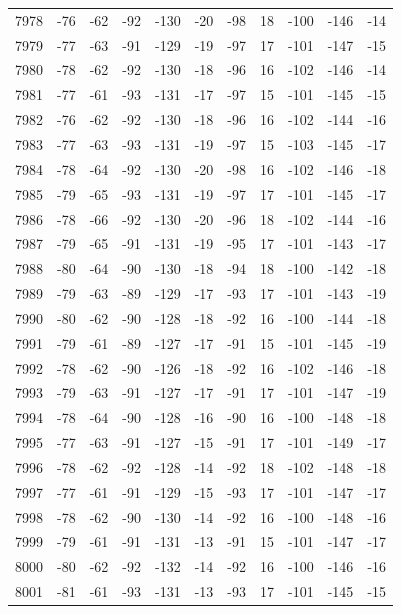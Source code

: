 \begin{table}[H]
\begin{tabular}{lllllllllll}
7978 & -76 & -62 & -92 & -130 & -20 & -98 & 18 & -100 & -146 & -14 \\
7979 & -77 & -63 & -91 & -129 & -19 & -97 & 17 & -101 & -147 & -15 \\
7980 & -78 & -62 & -92 & -130 & -18 & -96 & 16 & -102 & -146 & -14 \\
7981 & -77 & -61 & -93 & -131 & -17 & -97 & 15 & -101 & -145 & -15 \\
7982 & -76 & -62 & -92 & -130 & -18 & -96 & 16 & -102 & -144 & -16 \\
7983 & -77 & -63 & -93 & -131 & -19 & -97 & 15 & -103 & -145 & -17 \\
7984 & -78 & -64 & -92 & -130 & -20 & -98 & 16 & -102 & -146 & -18 \\
7985 & -79 & -65 & -93 & -131 & -19 & -97 & 17 & -101 & -145 & -17 \\
7986 & -78 & -66 & -92 & -130 & -20 & -96 & 18 & -102 & -144 & -16 \\
7987 & -79 & -65 & -91 & -131 & -19 & -95 & 17 & -101 & -143 & -17 \\
7988 & -80 & -64 & -90 & -130 & -18 & -94 & 18 & -100 & -142 & -18 \\
7989 & -79 & -63 & -89 & -129 & -17 & -93 & 17 & -101 & -143 & -19 \\
7990 & -80 & -62 & -90 & -128 & -18 & -92 & 16 & -100 & -144 & -18 \\
7991 & -79 & -61 & -89 & -127 & -17 & -91 & 15 & -101 & -145 & -19 \\
7992 & -78 & -62 & -90 & -126 & -18 & -92 & 16 & -102 & -146 & -18 \\
7993 & -79 & -63 & -91 & -127 & -17 & -91 & 17 & -101 & -147 & -19 \\
7994 & -78 & -64 & -90 & -128 & -16 & -90 & 16 & -100 & -148 & -18 \\
7995 & -77 & -63 & -91 & -127 & -15 & -91 & 17 & -101 & -149 & -17 \\
7996 & -78 & -62 & -92 & -128 & -14 & -92 & 18 & -102 & -148 & -18 \\
7997 & -77 & -61 & -91 & -129 & -15 & -93 & 17 & -101 & -147 & -17 \\
7998 & -78 & -62 & -90 & -130 & -14 & -92 & 16 & -100 & -148 & -16 \\
7999 & -79 & -61 & -91 & -131 & -13 & -91 & 15 & -101 & -147 & -17 \\
8000 & -80 & -62 & -92 & -132 & -14 & -92 & 16 & -100 & -146 & -16 \\
8001 & -81 & -61 & -93 & -131 & -13 & -93 & 17 & -101 & -145 & -15 \\

\end{tabular}
\end{table}
